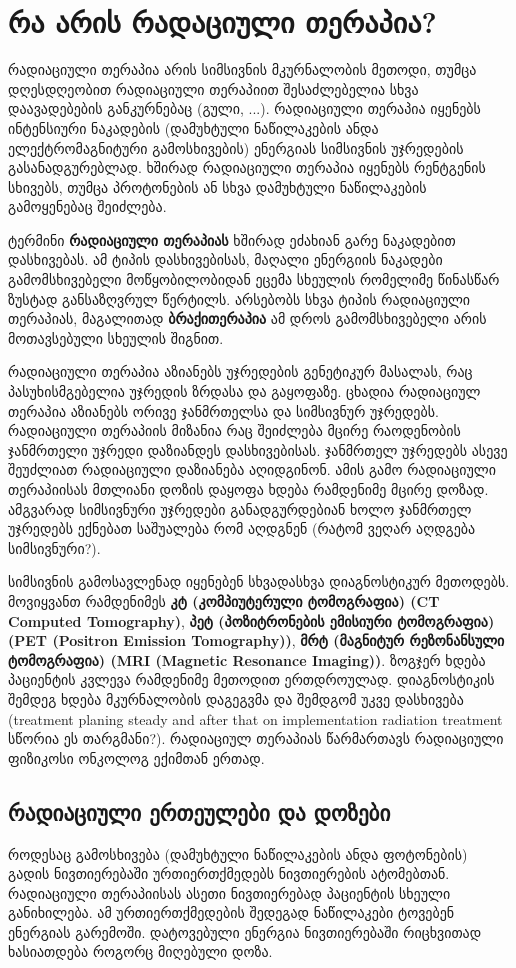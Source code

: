\documentclass[12pt,a4paper,]{report}
\begin{document}
\chapter{რა არის რადაციული თერაპია?}
რადიაციული თერაპია არის სიმსივნის მკურნალობის მეთოდი, თუმცა დღესდღეობით რადიაციული თერაპიით შესაძლებელია სხვა დაავადებების განკურნებაც (გული, ...). რადიაციული თერაპია იყენებს ინტენსიური ნაკადების (დამუხტული ნაწილაკების ანდა ელექტრომაგნიტური გამოსხივების) ენერგიას სიმსივნის უჯრედების გასანადგურებლად. ხშირად რადიაციული თერაპია იყენებს რენტგენის სხივებს, თუმცა პროტონების ან სხვა დამუხტული ნაწილაკების გამოყენებაც შეიძლება.

ტერმინი \textbf{რადიაციული თერაპიას} ხშირად ეძახიან  გარე ნაკადებით დასხივებას. ამ ტიპის დასხივებისას, მაღალი ენერგიის ნაკადები გამომსხივებელი მოწყობილობიდან ეცემა სხეულის რომელიმე წინასწარ ზუსტად განსაზღვრულ წერტილს. არსებობს სხვა ტიპის რადიაციული თერაპიას, მაგალითად \textbf{ბრაქითერაპია}\cite{brachytherapy} ამ დროს გამომსხივებელი არის მოთავსებული სხეულის შიგნით. 

რადიაციული თერაპია აზიანებს უჯრედების გენეტიკურ მასალას, რაც პასუხისმგებელია უჯრედის ზრდასა და გაყოფაზე. ცხადია რადიაციულ თერაპია აზიანებს ორივე ჯანმრთელსა და სიმსივნურ უჯრედებს. რადიაციული თერაპიის მიზანია რაც შეიძლება მცირე რაოდენობის ჯანმრთელი უჯრედი დაზიანდეს დასხივებისას. ჯანმრთელ უჯრედებს ასევე შეუძლიათ რადიაციული დაზიანება აღიდგინონ. ამის გამო რადიაციული თერაპიისას მთლიანი დოზის დაყოფა ხდება რამდენიმე მცირე დოზად. ამგვარად სიმსივნური უჯრედები განადგურდებიან ხოლო ჯანმრთელ უჯრედებს ექნებათ საშუალება რომ აღდგნენ (რატომ ვეღარ აღდგება სიმსივნური?). 

სიმსივნის გამოსავლენად იყენებენ სხვადასხვა დიაგნოსტიკურ მეთოდებს. მოვიყვანთ რამდენიმეს \textbf{კტ (კომპიუტერული ტომოგრაფია) (CT Computed Tomography)}, \textbf{პეტ (პოზიტრონების ემისიური ტომოგრაფია) (PET (Positron Emission Tomography))}, \textbf{მრტ (მაგნიტურ რეზონანსული ტომოგრაფია) (MRI (Magnetic Resonance Imaging))}. ზოგჯერ ხდება პაციენტის კვლევა რამდენიმე მეთოდით ერთდროულად. დიაგნოსტიკის შემდეგ ხდება მკურნალობის დაგეგვმა და შემდგომ უკვე დასხივება (treatment planing steady and after that on implementation radiation treatment სწორია ეს თარგმანი?). რადიაციულ თერაპიას წარმართავს რადიაციული ფიზიკოსი ონკოლოგ ექიმთან ერთად. 

\section{რადიაციული ერთეულები და დოზები}
როდესაც გამოსხივება (დამუხტული ნაწილაკების ანდა ფოტონების) გადის ნივთიერებაში ურთიერთქმედებს ნივთიერების ატომებთან. რადიაციული თერაპიისას ასეთი ნივთიერებად პაციენტის სხეული განიხილება. ამ ურთიერთქმედების შედეგად ნაწილაკები ტოვებენ ენერგიას გარემოში. დატოვებული ენერგია ნივთიერებაში რიცხვითად ხასიათდება როგორც მიღებული დოზა. 
\end{document}

